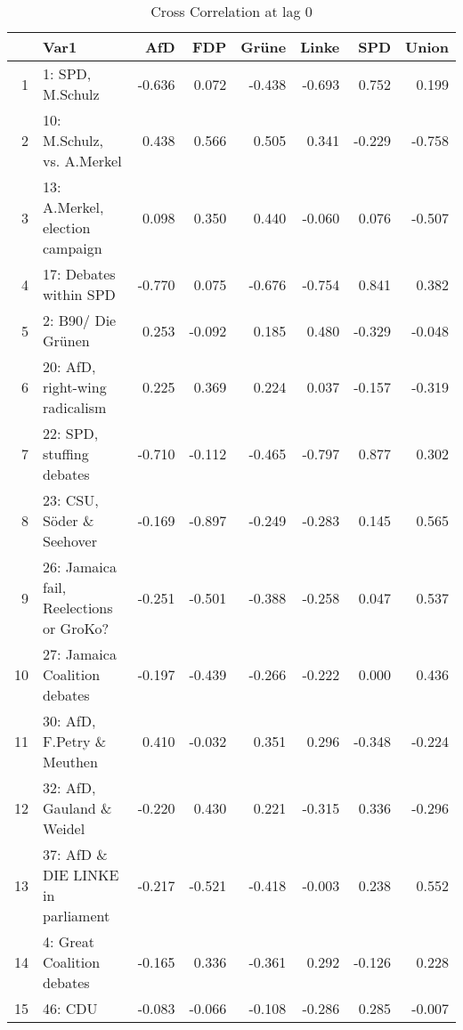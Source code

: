 \begin{table}[ht]
\centering
\begin{tabular}{rlrrrrrr}
  \hline
 & Var1 & AfD & FDP & Grüne & Linke & SPD & Union \\ 
  \hline
1 & 1: SPD, M.Schulz & -0.636 & 0.072 & -0.438 & -0.693 & 0.752 & 0.199 \\ 
  2 & 10: M.Schulz, vs. A.Merkel & 0.438 & 0.566 & 0.505 & 0.341 & -0.229 & -0.758 \\ 
  3 & 13: A.Merkel, election campaign & 0.098 & 0.350 & 0.440 & -0.060 & 0.076 & -0.507 \\ 
  4 & 17: Debates within SPD & -0.770 & 0.075 & -0.676 & -0.754 & 0.841 & 0.382 \\ 
  5 & 2: B90/ Die Grünen & 0.253 & -0.092 & 0.185 & 0.480 & -0.329 & -0.048 \\ 
  6 & 20: AfD, right-wing radicalism & 0.225 & 0.369 & 0.224 & 0.037 & -0.157 & -0.319 \\ 
  7 & 22: SPD, stuffing debates & -0.710 & -0.112 & -0.465 & -0.797 & 0.877 & 0.302 \\ 
  8 & 23: CSU, Söder \& Seehover & -0.169 & -0.897 & -0.249 & -0.283 & 0.145 & 0.565 \\ 
  9 & 26: Jamaica fail, Reelections or GroKo? & -0.251 & -0.501 & -0.388 & -0.258 & 0.047 & 0.537 \\ 
  10 & 27: Jamaica Coalition debates & -0.197 & -0.439 & -0.266 & -0.222 & 0.000 & 0.436 \\ 
  11 & 30: AfD, F.Petry \& Meuthen & 0.410 & -0.032 & 0.351 & 0.296 & -0.348 & -0.224 \\ 
  12 & 32: AfD, Gauland \& Weidel & -0.220 & 0.430 & 0.221 & -0.315 & 0.336 & -0.296 \\ 
  13 & 37: AfD \& DIE LINKE in parliament & -0.217 & -0.521 & -0.418 & -0.003 & 0.238 & 0.552 \\ 
  14 & 4: Great Coalition debates & -0.165 & 0.336 & -0.361 & 0.292 & -0.126 & 0.228 \\ 
  15 & 46: CDU & -0.083 & -0.066 & -0.108 & -0.286 & 0.285 & -0.007 \\ 
   \hline
\end{tabular}
\caption{Cross Correlation at lag 0} 
\label{t_ccf}
\end{table}
